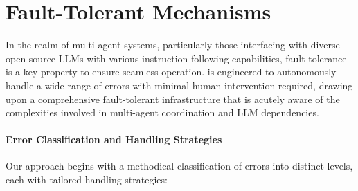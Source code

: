 \section{Fault-Tolerant Mechanisms}
\label{sec:tolerance}

In the realm of multi-agent systems, particularly those interfacing with diverse open-source LLMs with various instruction-following capabilities, fault tolerance is a key property to ensure seamless operation.
\ours is engineered to autonomously handle a wide range of errors with minimal human intervention required, drawing upon a comprehensive fault-tolerant infrastructure that is acutely aware of the complexities involved in multi-agent coordination and LLM dependencies.

\paragraph{Error Classification and Handling Strategies}
Our approach begins with a methodical classification of errors into distinct levels, each with tailored handling strategies:

